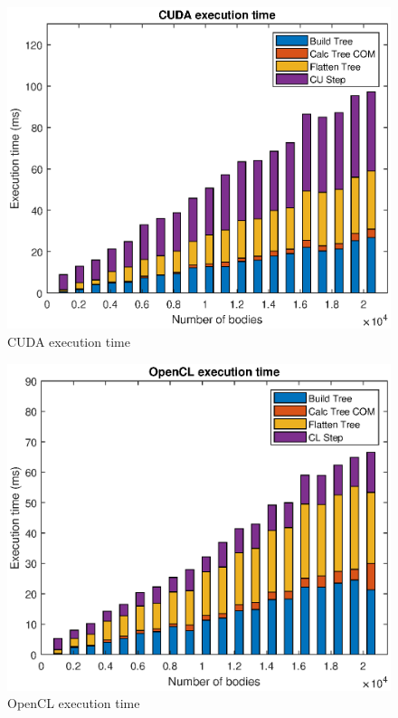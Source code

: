 \begin{figure}[H]
    \centering
    \includegraphics[width=.8\textwidth]{Results/Figs/CUDABarChart.eps}
    \caption{CUDA execution time}
    \label{fig:CUDAExecTime}
\end{figure}

\begin{figure}[H]
    \centering
    \includegraphics[width=.8\textwidth]{Results/Figs/OpenCLBarChart.eps}
    \caption{OpenCL execution time}
    \label{fig:OpenCLExecTime}
\end{figure}

